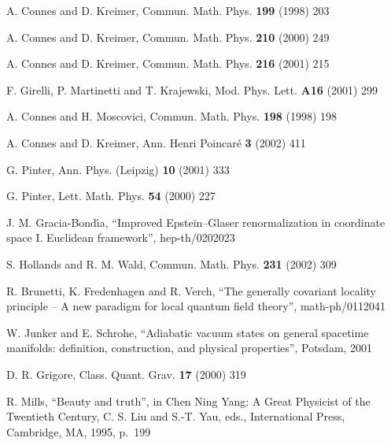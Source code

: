\documentclass[a4paper,12pt]{article}
\newcommand{\1}{\mathbf{1}}         %
\newcommand{\7}{\dagger}            %
\newcommand{\8}{\bullet}            %
\renewcommand{\.}{\cdot}            %
\renewcommand{\:}{\colon}           %
\begin{document}
\begin{thebibliography}{92}
A. Connes and D. Kreimer,
Commun. Math. Phys. {\bf 199} (1998) 203

A. Connes and D. Kreimer,
Commun. Math. Phys. {\bf 210} (2000) 249

A. Connes and D. Kreimer,
Commun. Math. Phys. {\bf 216} (2001) 215

F. Girelli, P. Martinetti and T. Krajewski,
Mod. Phys. Lett. {\bf A16} (2001) 299

A. Connes and H. Moscovici,
Commun. Math. Phys. {\bf 198} (1998) 198

A. Connes and D. Kreimer,
Ann. Henri Poincar\'e {\bf 3} (2002) 411

G. Pinter,
Ann. Phys. (Leipzig) {\bf 10} (2001) 333

G. Pinter,
Lett. Math. Phys. {\bf 54} (2000) 227

J. M. Gracia-Bond\'{\i}a,
``Improved Epstein--Glaser renormalization in coordinate space I.
Euclidean framework'',
hep-th/0202023

S. Hollands and R. M. Wald,
Commun. Math. Phys. {\bf 231} (2002) 309

R. Brunetti, K. Fredenhagen and R. Verch,
``The generally covariant locality principle -- A new paradigm for
local quantum field theory'',
math-ph/0112041

W. Junker and E. Schrohe,
``Adiabatic vacuum states on general spacetime manifolds: definition,
construction, and physical properties'',
Potsdam, 2001

D. R. Grigore,
Class. Quant. Grav. {\bf 17} (2000) 319

R. Mills,
``Beauty and truth'',
in Chen Ning Yang: A Great Physicist of the Twentieth Century,
C. S. Liu and S.-T. Yau, eds.,
International Press, Cambridge, MA, 1995, p.~199

\end{thebibliography}
\end{document}
